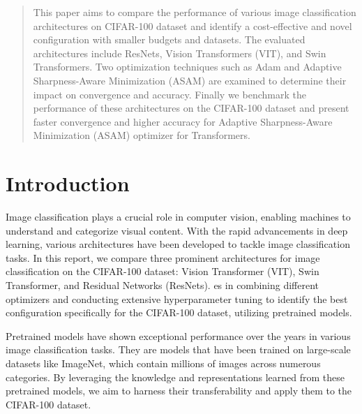 \documentclass{article}
\begin{document}
\printAffiliationsAndNotice{\icmlEqualContribution} %

\begin{abstract}
    This paper aims to compare the performance of various image classification architectures
    on CIFAR-100 dataset and identify a cost-effective and novel configuration with smaller budgets and datasets.
    The evaluated architectures include ResNets, Vision Transformers (VIT), and Swin Transformers.
    Two optimization techniques such as Adam and Adaptive Sharpness-Aware Minimization (ASAM) are examined
    to determine their impact on convergence and accuracy.
    Finally we benchmark the performance of these architectures on the CIFAR-100 dataset and
    present faster convergence and higher accuracy for Adaptive Sharpness-Aware Minimization (ASAM) optimizer for Transformers.

\end{abstract}

\section{Introduction}
Image classification plays a crucial role in computer vision, enabling machines to understand and categorize visual content.
With the rapid advancements in deep learning, various architectures have been developed to tackle image classification tasks.
In this report, we compare three prominent architectures for image classification on the CIFAR-100 dataset: Vision Transformer (VIT), Swin Transformer, and Residual Networks (ResNets).
es in combining different optimizers and conducting extensive hyperparameter tuning to identify the best configuration specifically for the CIFAR-100 dataset, utilizing pretrained models.

Pretrained models have shown exceptional performance over the years in various image classification tasks. They are models that have been trained on large-scale datasets like ImageNet, which contain millions of images across numerous categories.
By leveraging the knowledge and representations learned from these pretrained models, we aim to harness their transferability and apply them to the CIFAR-100 dataset.
\end{document}
